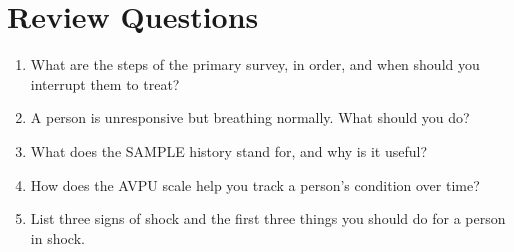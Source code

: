 \section{Review Questions}

\begin{enumerate}[leftmargin=*]
\item What are the steps of the primary survey, in order, and when should you interrupt them to treat?
\item A person is unresponsive but breathing normally. What should you do?
\item What does the SAMPLE history stand for, and why is it useful?
\item How does the AVPU scale help you track a person's condition over time?
\item List three signs of shock and the first three things you should do for a person in shock.
\end{enumerate}

